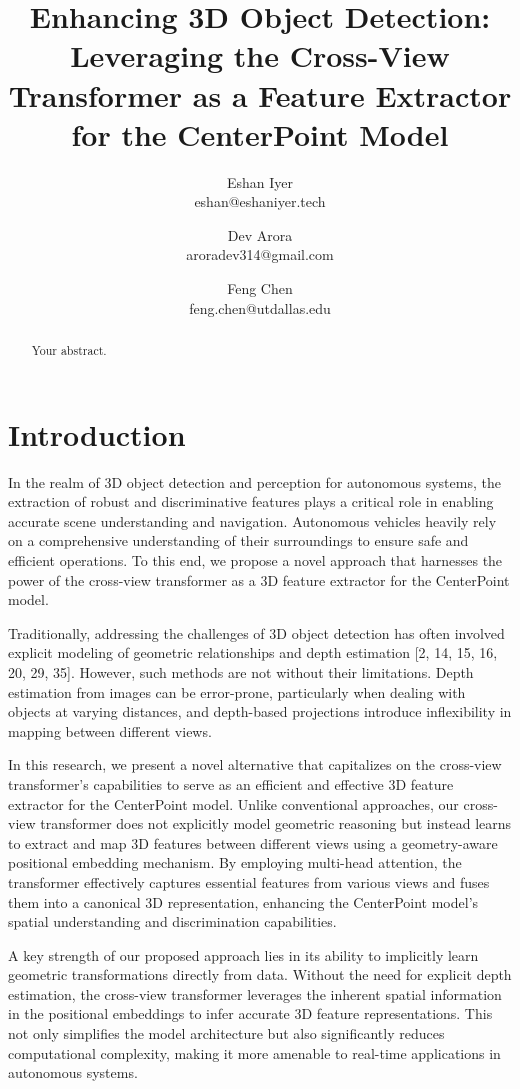 \documentclass[]{article}
\title{Enhancing 3D Object Detection: Leveraging the Cross-View Transformer as a Feature Extractor for the CenterPoint Model}
\author{Eshan Iyer \\ eshan@eshaniyer.tech  \and Dev Arora \\ aroradev314@gmail.com \and Feng Chen \\feng.chen@utdallas.edu }
\date{}
\begin{document}
\maketitle

\begin{abstract}
Your abstract.
\end{abstract}

\section{Introduction}
In the realm of 3D object detection and perception for autonomous systems, the extraction of robust and discriminative features plays a critical role in enabling accurate scene understanding and navigation. Autonomous vehicles heavily rely on a comprehensive understanding of their surroundings to ensure safe and efficient operations. To this end, we propose a novel approach that harnesses the power of the cross-view transformer as a 3D feature extractor for the CenterPoint model.

Traditionally, addressing the challenges of 3D object detection has often involved explicit modeling of geometric relationships and depth estimation [2, 14, 15, 16, 20, 29, 35]. However, such methods are not without their limitations. Depth estimation from images can be error-prone, particularly when dealing with objects at varying distances, and depth-based projections introduce inflexibility in mapping between different views.

In this research, we present a novel alternative that capitalizes on the cross-view transformer's capabilities to serve as an efficient and effective 3D feature extractor for the CenterPoint model. Unlike conventional approaches, our cross-view transformer does not explicitly model geometric reasoning but instead learns to extract and map 3D features between different views using a geometry-aware positional embedding mechanism. By employing multi-head attention, the transformer effectively captures essential features from various views and fuses them into a canonical 3D representation, enhancing the CenterPoint model's spatial understanding and discrimination capabilities.

A key strength of our proposed approach lies in its ability to implicitly learn geometric transformations directly from data. Without the need for explicit depth estimation, the cross-view transformer leverages the inherent spatial information in the positional embeddings to infer accurate 3D feature representations. This not only simplifies the model architecture but also significantly reduces computational complexity, making it more amenable to real-time applications in autonomous systems.
\end{document}
